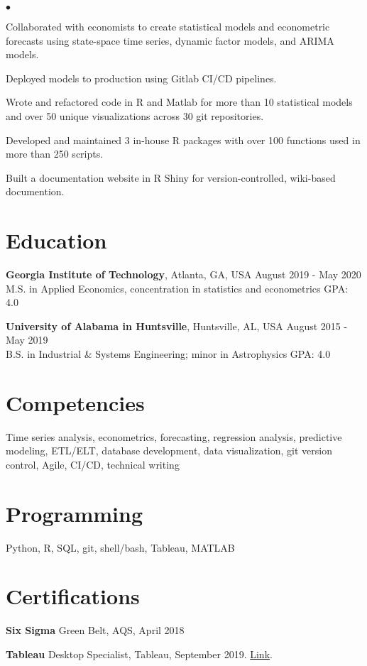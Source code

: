 \documentclass[margin, line]{res}
\newenvironment{list2}{
  \begin{list}{$\bullet$}{%
      \setlength{\itemsep}{0.04in}
      \setlength{\parsep}{0in} \setlength{\parskip}{0in}
      \setlength{\topsep}{0.05in} \setlength{\partopsep}{0in} 
      \setlength{\leftmargin}{\dimexpr 26pt-0.05in}}}
    {\end{list}}
\begin{document}
\begin{resume}
    \begin{list2}
        \item Collaborated with economists to create statistical models and econometric forecasts using state-space time series, dynamic factor models, and ARIMA models.
        \item Deployed models to production using Gitlab CI/CD pipelines.
        \item Wrote and refactored code in R and Matlab for more than 10 statistical models and over 50 unique visualizations across 30 git repositories. 
        \item Developed and maintained 3 in-house R packages with over 100 functions used in more than 250 scripts.
        \item Built a documentation website in R Shiny for version-controlled, wiki-based documention.
    \end{list2}


\section{\sc Education }

{\bf Georgia Institute of Technology}, Atlanta, GA, USA \hfill August 2019 - May 2020\\
M.S. in Applied Economics, concentration in statistics and econometrics \hfill GPA: 4.0


{\bf University of Alabama in Huntsville}, Huntsville, AL, USA \hfill August 2015 - May 2019 \\
B.S. in Industrial \& Systems Engineering; minor in Astrophysics \hfill GPA: 4.0

\section{\sc Competencies} 
Time series analysis, econometrics, forecasting, regression analysis, predictive modeling, ETL/ELT, database development, data visualization, git version control, Agile, CI/CD, technical writing

\section{\sc Programming} 
Python, R, SQL, git, shell/bash, Tableau, MATLAB


\section{\sc Certifications }
{\bf Six Sigma} Green Belt, AQS, April 2018
\vspace*{-3mm}

{\bf Tableau} Desktop Specialist, Tableau, September 2019. \href{https://www.credly.com/badges/e9a605a8-1977-4a1c-ab24-149a37c7fb36/linked_in_profile}{Link}.
\vspace*{-3mm}

\end{resume}
\end{document}
